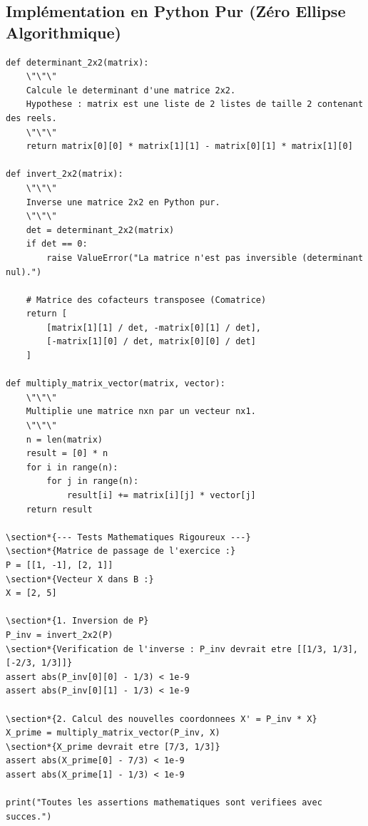 \documentclass{report}
\begin{document}
\subsection*{Implémentation en Python Pur (Zéro Ellipse Algorithmique)}

\begin{verbatim}
def determinant_2x2(matrix):
    \"\"\"
    Calcule le determinant d'une matrice 2x2.
    Hypothese : matrix est une liste de 2 listes de taille 2 contenant des reels.
    \"\"\"
    return matrix[0][0] * matrix[1][1] - matrix[0][1] * matrix[1][0]

def invert_2x2(matrix):
    \"\"\"
    Inverse une matrice 2x2 en Python pur.
    \"\"\"
    det = determinant_2x2(matrix)
    if det == 0:
        raise ValueError("La matrice n'est pas inversible (determinant nul).")

    # Matrice des cofacteurs transposee (Comatrice)
    return [
        [matrix[1][1] / det, -matrix[0][1] / det],
        [-matrix[1][0] / det, matrix[0][0] / det]
    ]

def multiply_matrix_vector(matrix, vector):
    \"\"\"
    Multiplie une matrice nxn par un vecteur nx1.
    \"\"\"
    n = len(matrix)
    result = [0] * n
    for i in range(n):
        for j in range(n):
            result[i] += matrix[i][j] * vector[j]
    return result

\section*{--- Tests Mathematiques Rigoureux ---}
\section*{Matrice de passage de l'exercice :}
P = [[1, -1], [2, 1]]
\section*{Vecteur X dans B :}
X = [2, 5]

\section*{1. Inversion de P}
P_inv = invert_2x2(P)
\section*{Verification de l'inverse : P_inv devrait etre [[1/3, 1/3], [-2/3, 1/3]]}
assert abs(P_inv[0][0] - 1/3) < 1e-9
assert abs(P_inv[0][1] - 1/3) < 1e-9

\section*{2. Calcul des nouvelles coordonnees X' = P_inv * X}
X_prime = multiply_matrix_vector(P_inv, X)
\section*{X_prime devrait etre [7/3, 1/3]}
assert abs(X_prime[0] - 7/3) < 1e-9
assert abs(X_prime[1] - 1/3) < 1e-9

print("Toutes les assertions mathematiques sont verifiees avec succes.")
\end{verbatim}
\end{document}
